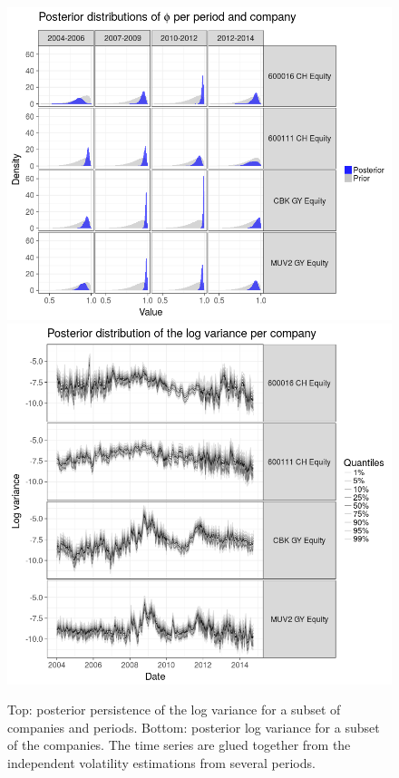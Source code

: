 \begin{figure}[p]
	\vspace*{-3.2cm}
	\centering
	\includegraphics[width=\linewidth]{../calculations/phi-timeline}
	\includegraphics[width=\linewidth]{../calculations/volatility}
	\caption[Timeline of persistence and volatility]{Top: posterior persistence of the log variance for a subset of companies and periods. Bottom: posterior log variance for a subset of the companies. The time series are glued together from the independent volatility estimations from several periods.}
	\label{fig:persistence}
\end{figure}
